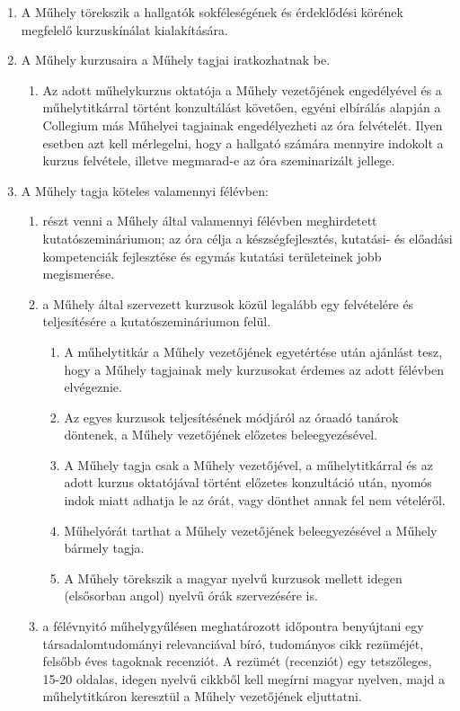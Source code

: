 \documentclass{../styles/rulebook}
\begin{document}
\begin{enumerate}
	\item A Műhely törekszik a hallgatók sokféleségének és érdeklődési körének megfelelő
	kurzuskínálat kialakítására.
	\item A Műhely kurzusaira a Műhely tagjai iratkozhatnak be.
	\begin{enumerate}
		\item Az adott műhelykurzus oktatója a Műhely vezetőjének engedélyével és a műhelytitkárral történt konzultálást követően, egyéni elbírálás alapján a Collegium más Műhelyei tagjainak engedélyezheti az óra felvételét. Ilyen esetben azt kell mérlegelni, hogy a hallgató számára mennyire indokolt a kurzus felvétele, illetve megmarad-e az óra szeminarizált jellege.
	\end{enumerate}
	\item A Műhely tagja köteles valamennyi félévben:
	\begin{enumerate}
		\item részt venni a Műhely által valamennyi félévben meghirdetett kutatószemináriumon; az óra célja a készségfejlesztés, kutatási- és előadási kompetenciák fejlesztése és egymás kutatási területeinek jobb megismerése.
		\item a Műhely által szervezett kurzusok közül legalább egy felvételére és teljesítésére a kutatószemináriumon felül.
		\begin{enumerate}
			\item A műhelytitkár a Műhely vezetőjének egyetértése után ajánlást tesz, hogy a Műhely tagjainak mely kurzusokat érdemes az adott félévben elvégeznie.
			\item Az egyes kurzusok teljesítésének módjáról az óraadó tanárok döntenek, a Műhely vezetőjének előzetes beleegyezésével.
			\item A Műhely tagja csak a Műhely vezetőjével, a műhelytitkárral és az adott kurzus oktatójával történt előzetes konzultáció után, nyomós indok miatt adhatja le az órát, vagy dönthet annak fel nem vételéről.
			\item Műhelyórát tarthat a Műhely vezetőjének beleegyezésével a Műhely bármely tagja.
			\item A Műhely törekszik a magyar nyelvű kurzusok mellett idegen (elsősorban angol) nyelvű órák szervezésére is.
		\end{enumerate}
		\item a félévnyitó műhelygyűlésen meghatározott időpontra benyújtani egy társadalomtudományi relevanciával bíró, tudományos cikk rezüméjét, felsőbb éves tagoknak recenziót. A rezümét (recenziót) egy tetszőleges, 15-20 oldalas, idegen nyelvű cikkből kell megírni magyar nyelven, majd a műhelytitkáron keresztül a Műhely vezetőjének eljuttatni.

\end{enumerate}
\end{enumerate}
\end{document}

